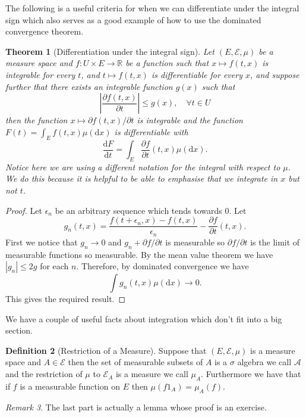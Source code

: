 \documentclass[11pt]{article}
\newtheorem{thm}{Theorem}[section]
\theoremstyle{definition}
\newtheorem{dfn}[thm]{Definition}
\theoremstyle{remark}
\newtheorem{remark}[thm]{Remark}
\begin{document}
The following is a useful criteria for when we can differentiate under the integral sign which also serves as a good example of how to use the dominated convergence theorem.
\begin{thm}[Differentiation under the integral sign]
Let $(E, \mathcal{E}, \mu)$ be a measure space and $f: U \times E \rightarrow \mathbb{R}$ be a function such that $x \mapsto f(t,x)$ is integrable for every $t$, and $t \mapsto f(t,x)$ is differentiable for every $x$, and suppose further that there exists an integrable function $g(x)$ such that
\[ \left| \frac{\partial f(t,x)}{\partial t} \right| \leq g(x), \quad \forall t \in U \] then the function $x \mapsto \partial f(t,x)/ \partial t$ is integrable and the function $F(t) = \int_E f(t,x) \mu(\mathrm{d}x)$ is differentiable with
\[ \frac{\mathrm{d}F}{\mathrm{d}t} = \int_E \frac{\partial f}{\partial t}(t,x) \mu(\mathrm{d}x). \] Notice here we are using a different notation for the integral with respect to $\mu$. We do this because it is helpful to be able to emphasise that we integrate in $x$ but not $t$. 
\end{thm}
\begin{proof} 
Let $\epsilon_n$ be an arbitrary sequence which tends towards $0$. Let 
\[ g_n(t,x) = \frac{f(t+\epsilon_n,x) - f(t,x)}{\epsilon_n} - \frac{\partial f}{\partial t}(t,x). \] First we notice that $g_n \rightarrow 0$ and $g_n + \partial f/\partial t$ is measurable so $\partial f/ \partial t$ is the limit of measurable functions so measurable. By the mean value theorem we have $|g_n| \leq 2g$ for each $n$. Therefore, by dominated convergence we have
\[ \int g_n(t,x) \mu(\mathrm{d}x) \rightarrow 0.  \] This gives the required result.
\end{proof}

We have a couple of useful facts about integration which don't fit into a big section.

\begin{dfn}[Restriction of a Measure]
Suppose that $(E, \mathcal{E}, \mu)$ is a measure space and $A \in \mathcal{E}$ then the set of measurable subsets of $A$ is a $\sigma$ algebra we call $\mathcal{A}$ and the restriction of $\mu$ to $\mathcal{E}_A$ is a measure we call $\mu_A$. Furthermore we have that if $f$ is a measurable function on $E$ then $\mu(f1_A) = \mu_A(f)$.
\end{dfn}
\begin{remark}
The last part is actually a lemma whose proof is an exercise.
\end{remark}
\end{document}
